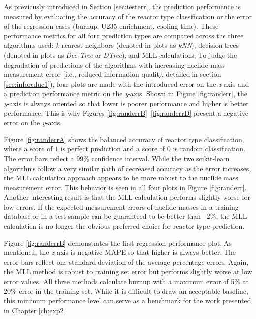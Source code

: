 As previously introduced in Section \ref{sec:testerr}, the prediction
performance is measured by evaluating the accuracy of the reactor type
classification or the error of the regression cases (burnup, \gls{U235}
enrichment, cooling time).  These performance metrics for all four prediction
types are compared across the three algorithms used: \textit{k}-nearest
neighbors (denoted in plots as \textit{kNN}), decision trees (denoted in plots
as \textit{Dec Tree} or \textit{DTree}), and \gls{MLL} calculations.  To judge
the degradation of predictions of the algorithms with increasing nuclide mass
measurement error (i.e., reduced information quality, detailed in section
\ref{sec:inforeduc1}), four plots are made with the introduced error on the
\textit{x}-axis and a prediction performance metric on the \textit{y}-axis.
Shown in Figure \ref{fig:randerr}, the \textit{y}-axis is always oriented so
that lower is poorer performance and higher is better performance. This is why
Figures \ref{fig:randerrB}--\ref{fig:randerrD} present a negative error on the
\textit{y}-axis.

Figure \ref{fig:randerrA} shows the balanced accuracy of reactor type
classification, where a score of $1$ is perfect prediction and a score of $0$
is random classification. The error bars reflect a 99\% confidence interval.
While the two scikit-learn algorithms follow a very similar path of decreased
accuracy as the error increases, the \gls{MLL} calculation approach appears to
be more robust to the nuclide mass measurement error. This behavior is seen in
all four plots in Figure \ref{fig:randerr}. Another interesting result is that
the \gls{MLL} calculation performs slightly worse for low errors. If the
expected measurement errors of nuclide masses in a training database or in a
test sample can be guaranteed to be better than ~2\%, the \gls{MLL} calculation
is no longer the obvious preferred choice for reactor type prediction.

Figure \ref{fig:randerrB} demonstrates the first regression performance plot.
As mentioned, the \textit{x}-axis is negative \gls{MAPE} so that higher is
always better.  The error bars reflect one standard deviation of the average
percentage errors.  Again, the \gls{MLL} method is robust to training set error
but performs slightly worse at low error values.  All three methods calculate
burnup with a maximum error of 5\% at 20\% error in the training set.  While it
is difficult to draw an acceptable baseline, this minimum performance level can
serve as a benchmark for the work presented in Chapter \ref{ch:exp2}. 

